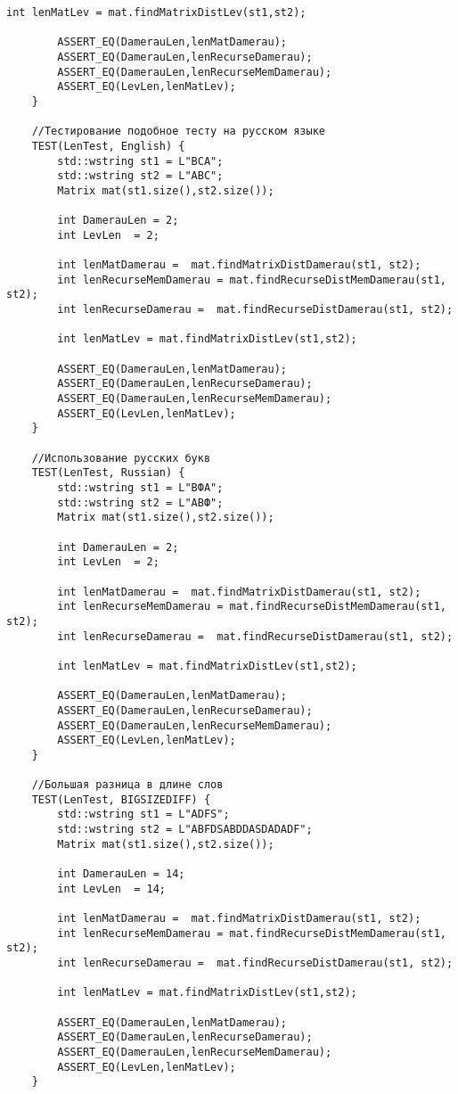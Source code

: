 \begin{lstlisting}[label=lst:unit_tests, caption=Модульные тесты]
        int lenMatLev = mat.findMatrixDistLev(st1,st2);
    
        ASSERT_EQ(DamerauLen,lenMatDamerau);
        ASSERT_EQ(DamerauLen,lenRecurseDamerau);
        ASSERT_EQ(DamerauLen,lenRecurseMemDamerau);
        ASSERT_EQ(LevLen,lenMatLev);
    }
    
    //Тестирование подобное тесту на русском языке
    TEST(LenTest, English) {
        std::wstring st1 = L"BCA";
        std::wstring st2 = L"ABC";
        Matrix mat(st1.size(),st2.size());
    
        int DamerauLen = 2;
        int LevLen  = 2;
    
        int lenMatDamerau =  mat.findMatrixDistDamerau(st1, st2);
        int lenRecurseMemDamerau = mat.findRecurseDistMemDamerau(st1, st2);
        int lenRecurseDamerau =  mat.findRecurseDistDamerau(st1, st2);
    
        int lenMatLev = mat.findMatrixDistLev(st1,st2);
    
        ASSERT_EQ(DamerauLen,lenMatDamerau);
        ASSERT_EQ(DamerauLen,lenRecurseDamerau);
        ASSERT_EQ(DamerauLen,lenRecurseMemDamerau);
        ASSERT_EQ(LevLen,lenMatLev);
    }
    
    //Использование русских букв
    TEST(LenTest, Russian) {
        std::wstring st1 = L"ВФА";
        std::wstring st2 = L"АВФ";
        Matrix mat(st1.size(),st2.size());
    
        int DamerauLen = 2;
        int LevLen  = 2;
    
        int lenMatDamerau =  mat.findMatrixDistDamerau(st1, st2);
        int lenRecurseMemDamerau = mat.findRecurseDistMemDamerau(st1, st2);
        int lenRecurseDamerau =  mat.findRecurseDistDamerau(st1, st2);
    
        int lenMatLev = mat.findMatrixDistLev(st1,st2);
    
        ASSERT_EQ(DamerauLen,lenMatDamerau);
        ASSERT_EQ(DamerauLen,lenRecurseDamerau);
        ASSERT_EQ(DamerauLen,lenRecurseMemDamerau);
        ASSERT_EQ(LevLen,lenMatLev);
    }
    
    //Большая разница в длине слов
    TEST(LenTest, BIGSIZEDIFF) {
        std::wstring st1 = L"ADFS";
        std::wstring st2 = L"ABFDSABDDASDADADF";
        Matrix mat(st1.size(),st2.size());
    
        int DamerauLen = 14;
        int LevLen  = 14;
    
        int lenMatDamerau =  mat.findMatrixDistDamerau(st1, st2);
        int lenRecurseMemDamerau = mat.findRecurseDistMemDamerau(st1, st2);
        int lenRecurseDamerau =  mat.findRecurseDistDamerau(st1, st2);
    
        int lenMatLev = mat.findMatrixDistLev(st1,st2);
    
        ASSERT_EQ(DamerauLen,lenMatDamerau);
        ASSERT_EQ(DamerauLen,lenRecurseDamerau);
        ASSERT_EQ(DamerauLen,lenRecurseMemDamerau);
        ASSERT_EQ(LevLen,lenMatLev);
    }
\end{lstlisting}